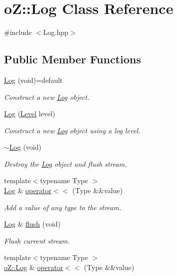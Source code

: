 \hypertarget{classo_z_1_1_log}{}\section{oZ\+::Log Class Reference}
\label{classo_z_1_1_log}


{\ttfamily \#include $<$Log.\+hpp$>$}

\subsection*{Public Member Functions}
\begin{DoxyCompactItemize}
\item 
\mbox{\hyperlink{classo_z_1_1_log_afc1467edb15b611bbb42630e1acaee12}{Log}} (void)=default
\begin{DoxyCompactList}\small\item\em Construct a new \mbox{\hyperlink{classo_z_1_1_log}{Log}} object. \end{DoxyCompactList}\item 
\mbox{\hyperlink{classo_z_1_1_log_ad3902d7978a48f2c02174bd048acec17}{Log}} (\mbox{\hyperlink{namespaceo_z_a72fc7662d5f07391ac6f0a5699014bfa}{Level}} level)
\begin{DoxyCompactList}\small\item\em Construct a new \mbox{\hyperlink{classo_z_1_1_log}{Log}} object using a log level. \end{DoxyCompactList}\item 
\mbox{\hyperlink{classo_z_1_1_log_a28d6db7c25427e63d38eebfc05290b52}{$\sim$\+Log}} (void)
\begin{DoxyCompactList}\small\item\em Destroy the \mbox{\hyperlink{classo_z_1_1_log}{Log}} object and flush stream. \end{DoxyCompactList}\item 
{\footnotesize template$<$typename Type $>$ }\\\mbox{\hyperlink{classo_z_1_1_log}{Log}} \& \mbox{\hyperlink{classo_z_1_1_log_a0cb4c3c614b1d5ae6285aecb31554fb4}{operator$<$$<$}} (Type \&\&value)
\begin{DoxyCompactList}\small\item\em Add a value of any type to the stream. \end{DoxyCompactList}\item 
\mbox{\hyperlink{classo_z_1_1_log}{Log}} \& \mbox{\hyperlink{classo_z_1_1_log_a41c8972eca682eb2701126b43a2f9099}{flush}} (void)
\begin{DoxyCompactList}\small\item\em Flush current stream. \end{DoxyCompactList}\item 
{\footnotesize template$<$typename Type $>$ }\\\mbox{\hyperlink{classo_z_1_1_log}{o\+Z\+::\+Log}} \& \mbox{\hyperlink{classo_z_1_1_log_ab4b6199f686c0b32f40be8885fca9db0}{operator$<$$<$}} (Type \&\&value)
\end{DoxyCompactItemize}
